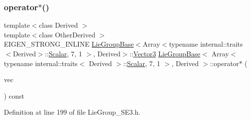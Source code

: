 \subsubsection{\texorpdfstring{operator$\ast$()}{operator*()}\hspace{0.1cm}{\footnotesize\ttfamily [4/4]}}
{\footnotesize\ttfamily template$<$class Derived $>$ \\
template$<$class Other\+Derived $>$ \\
E\+I\+G\+E\+N\+\_\+\+S\+T\+R\+O\+N\+G\+\_\+\+I\+N\+L\+I\+NE \hyperlink{class_lie_group_base}{Lie\+Group\+Base}$<$Array$<$typename internal\+::traits$<$Derived$>$\+::\hyperlink{class_lie_group_base_3_01_array_3_01typename_01internal_1_1traits_3_01_derived_01_4_1_1_scalar_0d6d4b5459662fc32c7117aee50362fb1_a831695c575380c9a1df32eff9fc4a8c6}{Scalar}, 7, 1 $>$, Derived$>$\+::\hyperlink{class_lie_group_base_3_01_array_3_01typename_01internal_1_1traits_3_01_derived_01_4_1_1_scalar_0d6d4b5459662fc32c7117aee50362fb1_acf35a22e3543ed4824de3c19c965961c}{Vector3} \hyperlink{class_lie_group_base}{Lie\+Group\+Base}$<$ Array$<$ typename internal\+::traits$<$ Derived $>$\+::\hyperlink{class_lie_group_base_3_01_array_3_01typename_01internal_1_1traits_3_01_derived_01_4_1_1_scalar_0d6d4b5459662fc32c7117aee50362fb1_a831695c575380c9a1df32eff9fc4a8c6}{Scalar}, 7, 1 $>$, Derived $>$\+::operator$\ast$ (\begin{DoxyParamCaption}\item[{const Matrix\+Base$<$ Other\+Derived $>$ \&}]{vec }\end{DoxyParamCaption}) const}



Definition at line 199 of file Lie\+Group\+\_\+\+S\+E3.\+h.

\hypertarget{class_lie_group_base_3_01_array_3_01typename_01internal_1_1traits_3_01_derived_01_4_1_1_scalar_0d6d4b5459662fc32c7117aee50362fb1_a374b22e97d35645a2b38c9f37d926633}{}\label{class_lie_group_base_3_01_array_3_01typename_01internal_1_1traits_3_01_derived_01_4_1_1_scalar_0d6d4b5459662fc32c7117aee50362fb1_a374b22e97d35645a2b38c9f37d926633} 
